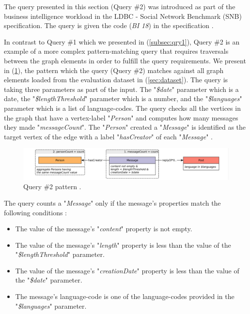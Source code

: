 {The query presented in this section (Query \#2) was introduced as part of the business intelligence workload in the LDBC - Social Network Benchmark (SNB) specification. The query is given the code (\textit{BI 18}) in the specification \cite{prat2017ldbc}. 

In contrast to Query \#1 which we presented in (\ref{subsec:qry1}), Query \#2  is an example of a more complex pattern-matching query that requires traversals between the graph elements in order to fulfill the query requirements. We present in (\ref{fig:Query2}), the pattern which the query (Query \#2) matches against all graph elements loaded from the evaluation dataset in (\ref{sec:dataset}). The query is taking three parameters as part of the input. The "\textit{\$date}" parameter which is a date, the "\textit{\$lengthThreshold}" parameter which is a number, and the "\textit{\$languages}" parameter which is a list of language-codes. The query checks all the vertices in the graph that have a vertex-label "\textit{Person}" and computes how many messages they made "\textit{messageCount}". The "\textit{Person}" created a "\textit{Message}" is identified as the target vertex of the edge with a label "\textit{hasCreator}" of each "\textit{Message}" \cite{prat2017ldbc}.

\begin{figure}[ht]
\centering
\includegraphics[width=1\textwidth]{pics/Query2.png}
\caption{Query \#2 pattern \cite{prat2017ldbc}.}
\label{fig:Query2}
\end{figure} 

The query counts a "\textit{Message}" only if the message's properties match the following conditions \cite{prat2017ldbc}:

\begin{itemize}

    \item The value of the message's "\textit{content}" property is not empty.
    \item The value of the message's "\textit{length}" property is less than the value of the "\textit{\$lengthThreshold}" parameter.
    \item The value of the message's "\textit{creationDate}" property is less than the value of the "\textit{\$date}" parameter.
    \item The message's language-code is one of the language-codes provided in the "\textit{\$languages}" parameter.
    

\end{itemize}}
